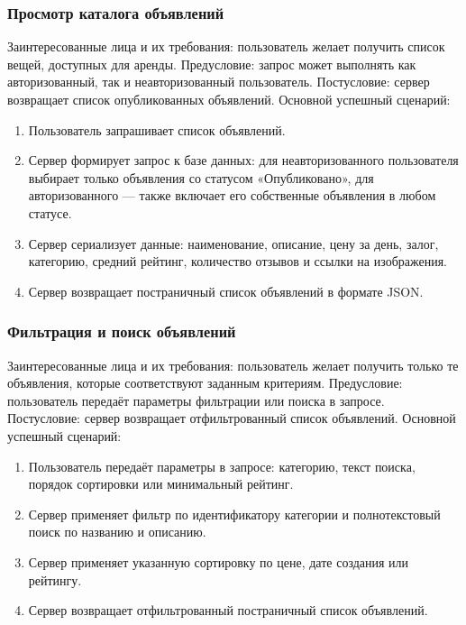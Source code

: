 \subsubsection{Просмотр каталога объявлений}
Заинтересованные лица и их требования: пользователь желает получить список вещей, доступных для аренды.
Предусловие: запрос может выполнять как авторизованный, так и неавторизованный пользователь.
Постусловие: сервер возвращает список опубликованных объявлений.
Основной успешный сценарий:
\begin{enumerate}
\item Пользователь запрашивает список объявлений.
\item Сервер формирует запрос к базе данных: для неавторизованного пользователя выбирает только объявления со статусом «Опубликовано», для авторизованного — также включает его собственные объявления в любом статусе.
\item Сервер сериализует данные: наименование, описание, цену за день, залог, категорию, средний рейтинг, количество отзывов и ссылки на изображения.
\item Сервер возвращает постраничный список объявлений в формате JSON.
\end{enumerate}

\subsubsection{Фильтрация и поиск объявлений}
Заинтересованные лица и их требования: пользователь желает получить только те объявления, которые соответствуют заданным критериям.
Предусловие: пользователь передаёт параметры фильтрации или поиска в запросе.
Постусловие: сервер возвращает отфильтрованный список объявлений.
Основной успешный сценарий:
\begin{enumerate}
\item Пользователь передаёт параметры в запросе: категорию, текст поиска, порядок сортировки или минимальный рейтинг.
\item Сервер применяет фильтр по идентификатору категории и полнотекстовый поиск по названию и описанию.
\item Сервер применяет указанную сортировку по цене, дате создания или рейтингу.
\item Сервер возвращает отфильтрованный постраничный список объявлений.
\end{enumerate}

